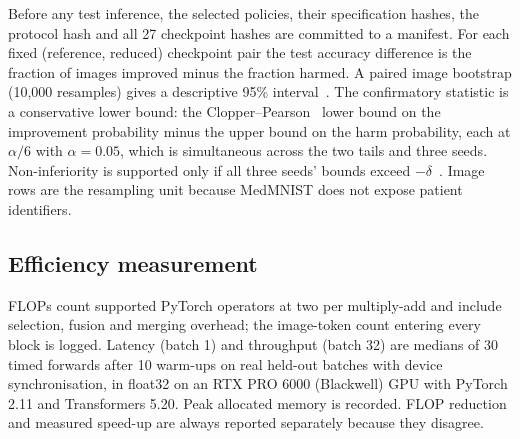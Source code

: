 Before any test inference, the selected policies, their specification hashes, the protocol hash and all 27 checkpoint hashes are committed to a manifest. For each fixed (reference, reduced) checkpoint pair the test accuracy difference is the fraction of images improved minus the fraction harmed. A paired image bootstrap (10{,}000 resamples) gives a descriptive 95\% interval~\cite{efron1994bootstrap}. The confirmatory statistic is a conservative lower bound: the Clopper--Pearson~\cite{clopper1934} lower bound on the improvement probability minus the upper bound on the harm probability, each at $\alpha/6$ with $\alpha{=}0.05$, which is simultaneous across the two tails and three seeds. Non-inferiority is supported only if all three seeds' bounds exceed $-\delta$~\cite{walker2011noninferiority}. Image rows are the resampling unit because MedMNIST does not expose patient identifiers.

\subsection{Efficiency measurement}
FLOPs count supported PyTorch operators at two per multiply-add and include selection, fusion and merging overhead; the image-token count entering every block is logged. Latency (batch 1) and throughput (batch 32) are medians of 30 timed forwards after 10 warm-ups on real held-out batches with device synchronisation, in float32 on an RTX PRO 6000 (Blackwell) GPU with PyTorch 2.11 and Transformers 5.20. Peak allocated memory is recorded. FLOP reduction and measured speed-up are always reported separately because they disagree.
